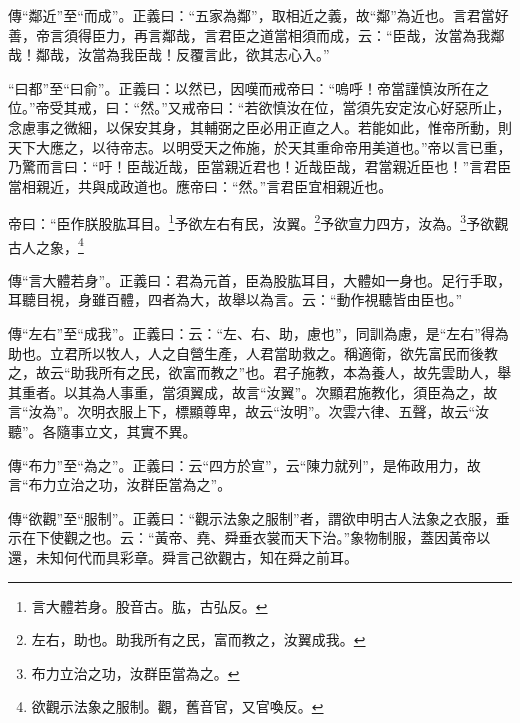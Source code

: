 {\noindent\zhuan{}\fzbyks 傳“鄰近”至“而成”。正義曰：“五家為鄰”，取相近之義，故“鄰”為近也。言君當好善，帝言須得臣力，再言鄰哉，言君臣之道當相須而成，云：“臣哉，汝當為我鄰哉！鄰哉，汝當為我臣哉！反覆言此，欲其志心入。” \par}

{\noindent\shu{}\fzkt “曰都”至“曰俞”。正義曰：以然已，因嘆而戒帝曰：“嗚呼！帝當謹慎汝所在之位。”帝受其戒，曰：“然。”又戒帝曰：“若欲慎汝在位，當須先安定汝心好惡所止，念慮事之微細，以保安其身，其輔弼之臣必用正直之人。若能如此，惟帝所動，則天下大應之，以待帝志。以明受天之佈施，於天其重命帝用美道也。”帝以言已重，乃驚而言曰：“吁！臣哉近哉，臣當親近君也！近哉臣哉，君當親近臣也！”言君臣當相親近，共與成政道也。應帝曰：“然。”言君臣宜相親近也。 \par}

帝曰：“臣作朕股肱耳目。\footnote{言大體若身。股音古。肱，古弘反。}予欲左右有民，汝翼。\footnote{左右，助也。助我所有之民，富而教之，汝翼成我。}予欲宣力四方，汝為。\footnote{布力立治之功，汝群臣當為之。}予欲觀古人之象，\footnote{欲觀示法象之服制。觀，舊音官，又官喚反。}


{\noindent\zhuan{}\fzbyks 傳“言大體若身”。正義曰：君為元首，臣為股肱耳目，大體如一身也。足行手取，耳聽目視，身雖百體，四者為大，故舉以為言。云：“動作視聽皆由臣也。” \par}

{\noindent\zhuan{}\fzbyks 傳“左右”至“成我”。正義曰：云：“左、右、助，慮也”，同訓為慮，是“左右”得為助也。立君所以牧人，人之自營生產，人君當助救之。稱適衛，欲先富民而後教之，故云“助我所有之民，欲富而教之”也。君子施教，本為養人，故先雲助人，舉其重者。以其為人事重，當須翼成，故言“汝翼”。次顯君施教化，須臣為之，故言“汝為”。次明衣服上下，標顯尊卑，故云“汝明”。次雲六律、五聲，故云“汝聽”。各隨事立文，其實不異。 \par}

{\noindent\zhuan{}\fzbyks 傳“布力”至“為之”。正義曰：云“四方於宣”，云“陳力就列”，是佈政用力，故言“布力立治之功，汝群臣當為之”。 \par}

{\noindent\zhuan{}\fzbyks 傳“欲觀”至“服制”。正義曰：“觀示法象之服制”者，謂欲申明古人法象之衣服，垂示在下使觀之也。云：“黃帝、堯、舜垂衣裳而天下治。”象物制服，蓋因黃帝以還，未知何代而具彩章。舜言己欲觀古，知在舜之前耳。 \par}

